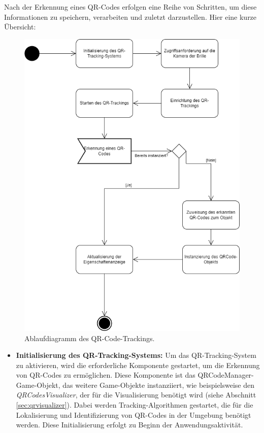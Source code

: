 \begin{itemize}
Nach der Erkennung eines QR-Codes erfolgen eine Reihe von Schritten, um diese Informationen zu speichern, verarbeiten
und zuletzt darzustellen.
Hier eine kurze Übersicht:

\begin{figure}[H]
    \centering
    \includegraphics[scale=0.5, angle=0]{images/QRAblauf}
    \caption{Ablaufdiagramm des QR-Code-Trackings.}
    \label{fig:qrtracking}
\end{figure}

\begin{itemize}

    \item \textbf{Initialisierung des QR-Tracking-Systems:}
    Um das QR-Tracking-System zu aktivieren, wird die erforderliche Komponente gestartet, um die Erkennung von QR-Codes zu ermöglichen. Diese Komponente ist das QRCodeManager-Game-Objekt, das weitere Game-Objekte instanziiert, wie beispielsweise den \textit{QRCodesVisualizer}, der für die Visualisierung benötigt wird (siehe Abschnitt \ref{sec:qrvisualizer}). Dabei werden Tracking-Algorithmen gestartet, die für die Lokalisierung und Identifizierung von QR-Codes in der Umgebung benötigt werden. Diese Initialisierung erfolgt zu Beginn der Anwendungsaktivität.


\end{itemize}
\end{itemize}
